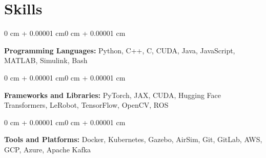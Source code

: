 \documentclass[10pt, a4paper]{article}
\newcommand{\customsection}[1]{%
    \section*{%
        \textbf{%
            \fontsize{11pt}{11pt}\selectfont
            \color{Blue}#1%
        }%
        \hspace{0.5em}\color{Blue}\hrulefill%
    }%
    \vspace{0.03cm}%
}
\newenvironment{onecolentry}{
    \begin{adjustwidth}{0 cm + 0.00001 cm}{0 cm + 0.00001 cm}
}{
    \end{adjustwidth}
}
\begin{document}
\customsection{Skills}

\begin{onecolentry}
    \textbf{Programming Languages:} Python, C++, C, CUDA, Java, JavaScript, MATLAB, Simulink, Bash
\end{onecolentry}
\vspace{0.08cm}

\begin{onecolentry}
    \textbf{Frameworks and Libraries:} PyTorch, JAX, CUDA, Hugging Face Transformers, LeRobot, TensorFlow, OpenCV, ROS
\end{onecolentry}
\vspace{0.08cm}

\begin{onecolentry}
    \textbf{Tools and Platforms:} Docker, Kubernetes, Gazebo, AirSim, Git, GitLab, AWS, GCP, Azure, Apache Kafka
\end{onecolentry}
\end{document}

